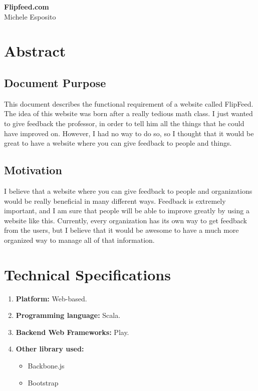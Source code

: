 \documentclass[a4paper]{article}
\begin{document}
\begin{center}
{\bf{\huge Flipfeed.com }}\\
Michele Esposito\\
\end{center}

\section{Abstract} %
\label{sec:Abstract}
\subsection{Document Purpose} %
\label{sub:Document Purpose}
This document describes the functional requirement of a website called FlipFeed. The idea of this website was born after a really tedious math class. I just wanted to give feedback the professor, in order to tell him all the things that he could have improved on. However, I had no way to do so, so I thought that it would be great to have a website where you can give feedback to people and things. 
\subsection{Motivation} %
\label{sub:Motivatio}
I believe that a website where you can give feedback to people and organizations would be really beneficial in many different ways. Feedback is extremely important, and I am sure that people will be able to improve greatly by using a website like this. Currently, every organization has its own way to get feedback from the users, but I believe that it would be awesome to have a much more organized way to manage all of that information.
\section{Technical Specifications} %
\label{sec:Techninal Specifications}
\begin{enumerate}
  \item {\bf Platform: } Web-based.
  \item {\bf Programming language:} Scala.
  \item {\bf Backend Web Frameworks:} Play.
  \item {\bf Other library used:}
    \begin{itemize}
      \item Backbone.js
      \item Bootstrap
    \end{itemize}
\end{enumerate}
\end{document}
